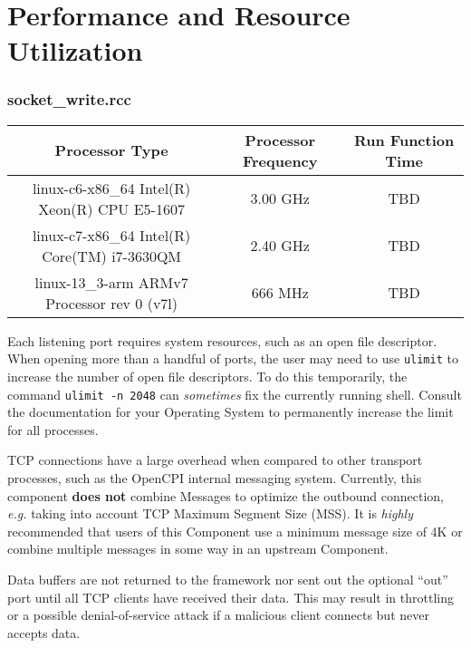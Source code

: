 \documentclass{article}
\def\comp{socket\_write}
\begin{document}
\section*{Performance and Resource Utilization}

\subsubsection*{\comp.rcc}
\begin{scriptsize}
  \begin{tabular}{|c|c|c|}
    \hline
    \rowcolor{blue}
    Processor Type                                & Processor Frequency & Run Function Time \\
    \hline
    linux-c6-x86\_64 Intel(R) Xeon(R) CPU E5-1607 & 3.00 GHz            & TBD               \\
    \hline
    linux-c7-x86\_64 Intel(R) Core(TM) i7-3630QM  & 2.40 GHz            & TBD               \\
    \hline
    linux-13\_3-arm ARMv7 Processor rev 0 (v7l)    & 666 MHz             & TBD               \\
    \hline
  \end{tabular}
\end{scriptsize}
\medskip

Each listening port requires system resources, such as an open file descriptor. When opening more than a handful of ports, the user may need to use \verb+ulimit+ to increase the number of open file descriptors. To do this temporarily, the command \verb+ulimit -n 2048+ can \textit{sometimes} fix the currently running shell. Consult the documentation for your Operating System to permanently increase the limit for all processes.\\
\medskip

TCP connections have a large overhead when compared to other transport processes, such as the OpenCPI internal messaging system. Currently, this component \textbf{does not} combine Messages to optimize the outbound connection, \textit{e.g.} taking into account TCP Maximum Segment Size (MSS). It is \textit{highly} recommended that users of this Component use a minimum message size of 4K or combine multiple messages in some way in an upstream Component.
\medskip

Data buffers are not returned to the framework nor sent out the optional ``out'' port until all TCP clients have received their data. This may result in throttling or a possible denial-of-service attack if a malicious client connects but never accepts data.
\end{document}
